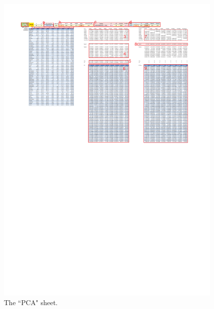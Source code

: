\documentclass[article]{jss}
\numberwithin{equation}{subsection}
\begin{document}
        \begin{figure}[!tbh]
        	\includegraphics[width=\linewidth, keepaspectratio=true]{img/PCASheetComputed_markup}
        	\vspace{-20pt}\centering{}\protect\caption{The ``PCA" sheet.}\label{fig:PCA sheet computed}
        \end{figure}
        
\end{document}
